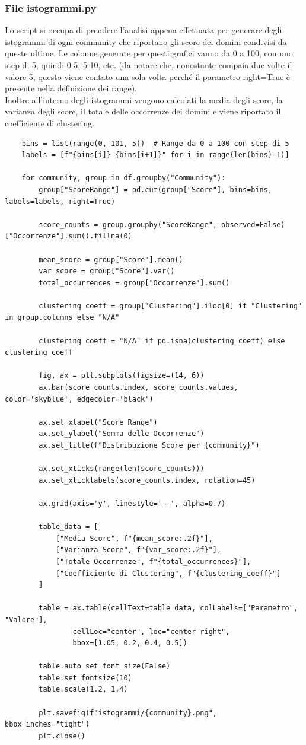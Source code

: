 \documentclass[12pt]{article}
\begin{document}
	\subsubsection{File istogrammi.py}
	Lo script si occupa di prendere l'analisi appena effettuata per generare degli istogrammi di ogni community che riportano gli score dei domini condivisi da queste ultime. Le colonne generate per questi grafici vanno da 0 a 100, con uno step di 5, quindi 0-5, 5-10, etc. (da notare che, nonostante compaia due volte il valore 5, questo viene contato una sola volta perché il parametro right=True è presente nella definizione dei range).\\
	Inoltre all'interno degli istogrammi vengono calcolati la media degli score, la varianza degli score, il totale delle occorrenze dei domini e viene riportato il coefficiente di clustering.
	\begin{lstlisting}
	bins = list(range(0, 101, 5))  # Range da 0 a 100 con step di 5
	labels = [f"{bins[i]}-{bins[i+1]}" for i in range(len(bins)-1)]  
	
	for community, group in df.groupby("Community"):
		group["ScoreRange"] = pd.cut(group["Score"], bins=bins, labels=labels, right=True)
		
		score_counts = group.groupby("ScoreRange", observed=False)["Occorrenze"].sum().fillna(0)
		
		mean_score = group["Score"].mean()
		var_score = group["Score"].var()
		total_occurrences = group["Occorrenze"].sum()
		
		clustering_coeff = group["Clustering"].iloc[0] if "Clustering" in group.columns else "N/A"
		
		clustering_coeff = "N/A" if pd.isna(clustering_coeff) else clustering_coeff
		
		fig, ax = plt.subplots(figsize=(14, 6)) 
		ax.bar(score_counts.index, score_counts.values, color='skyblue', edgecolor='black')
		
		ax.set_xlabel("Score Range")
		ax.set_ylabel("Somma delle Occorrenze")
		ax.set_title(f"Distribuzione Score per {community}")
		
		ax.set_xticks(range(len(score_counts))) 
		ax.set_xticklabels(score_counts.index, rotation=45) 
		
		ax.grid(axis='y', linestyle='--', alpha=0.7)
		
		table_data = [
			["Media Score", f"{mean_score:.2f}"],
			["Varianza Score", f"{var_score:.2f}"],
			["Totale Occorrenze", f"{total_occurrences}"],
			["Coefficiente di Clustering", f"{clustering_coeff}"]
		]
		
		table = ax.table(cellText=table_data, colLabels=["Parametro", "Valore"],
				cellLoc="center", loc="center right",
				bbox=[1.05, 0.2, 0.4, 0.5]) 
		
		table.auto_set_font_size(False)
		table.set_fontsize(10)
		table.scale(1.2, 1.4) 
		
		plt.savefig(f"istogrammi/{community}.png", bbox_inches="tight")
		plt.close()
	\end{lstlisting}
\end{document}
